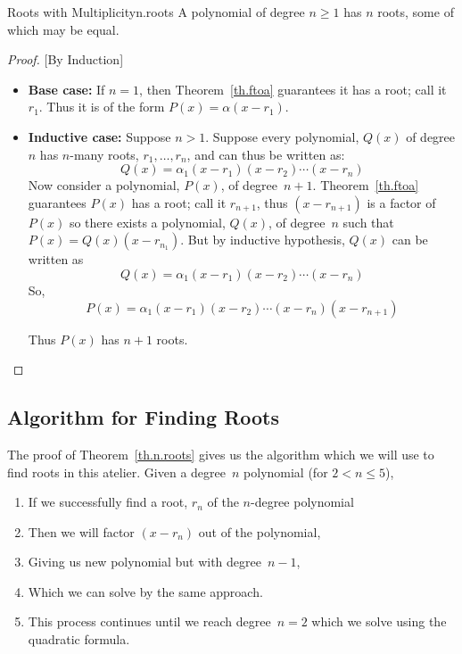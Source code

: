\begin{theorem}{Roots with Multiplicity}{n.roots}
  A polynomial of degree $n\ge 1$ has $n$ roots, some of which may be
  equal.
\end{theorem}
\begin{proof}

  [By Induction]
  
  \begin{itemize}
    
  \item \textbf{Base case:} If $n=1$, then Theorem~\ref{th.ftoa}
    guarantees it has a root; call it $r_1$.  Thus it is of the form
    $P(x)=\alpha (x-r_1)$.
  \item \textbf{Inductive case:} Suppose $n>1$.  Suppose every
    polynomial, $Q(x)$ of degree $n$ has $n$-many roots,
    $r_1,\ldots,r_n$, and can thus be written as:
    \[Q(x) = \alpha_1 (x - r_1) (x - r_2) \cdots (x - r_n)\]
    Now consider a polynomial, $P(x)$, of
    degree~$n+1$.  Theorem~\ref{th.ftoa} guarantees $P(x)$ has a root;
    call it $r_{n+1}$, thus $(x-r_{n+1})$ is a factor of $P(x)$ so there
    exists a polynomial, $Q(x)$, of degree~$n$ such that
    $P(x) =  Q(x) (x-r_{n_1})$.
    But by inductive hypothesis, $Q(x)$ can be written
    as \[Q(x) = \alpha_1 (x - r_1) (x - r_2) \cdots (x - r_n)\]
    So, \[P(x) = \alpha_1 (x - r_1) (x - r_2) \cdots (x - r_n) (x-r_{n+1})\]

    Thus $P(x)$ has $n+1$ roots.
  \end{itemize}
\end{proof}

\subsection{Algorithm for Finding Roots}
\label{sec.algorithm}

The proof of Theorem~\ref{th.n.roots} gives us the algorithm which we will use to find
roots in this atelier.  Given a degree~$n$ polynomial (for $2<n\leq5$),
\begin{enumerate}
\item If we successfully find a root, $r_n$ of the $n$-degree polynomial
\item Then we will factor  $(x-r_n)$ out of the polynomial,
\item Giving us new polynomial but with degree~$n-1$,
\item Which we can solve by the same approach.  
\item This process continues until we reach degree~$n=2$ which we
  solve using the quadratic formula.

\end{enumerate}


